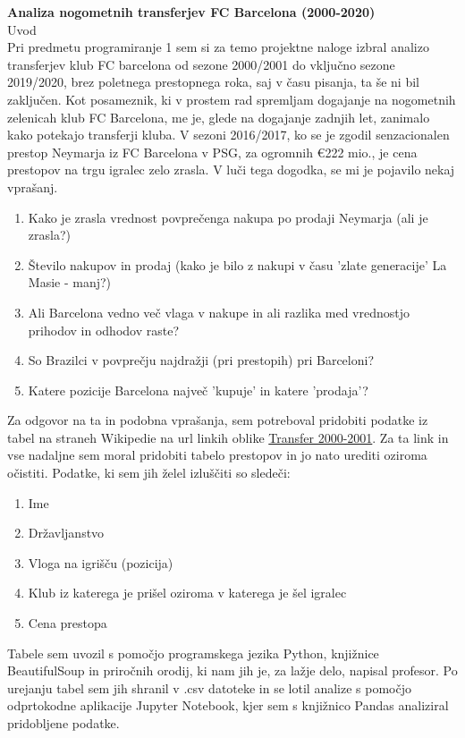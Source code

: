 \documentclass[a4paper, 12pt]{article}
\begin{document}
\thispagestyle{empty}
\begin{center}
{\bf Analiza nogometnih transferjev FC Barcelona (2000-2020)}\\[3mm]
{\sc Uvod} \\ \medskip
Pri predmetu programiranje 1 sem si za temo projektne naloge izbral analizo transferjev klub FC barcelona od sezone 2000/2001
do vključno sezone 2019/2020, brez poletnega prestopnega roka, saj v času pisanja, ta še ni bil zaključen.
Kot posameznik, ki v prostem rad spremljam dogajanje na nogometnih zelenicah klub FC Barcelona, me je, glede na dogajanje zadnjih let, zanimalo kako potekajo transferji kluba. 
V sezoni 2016/2017, ko se je zgodil senzacionalen prestop Neymarja iz FC Barcelona v PSG, za ogromnih \euro 222 mio., je cena prestopov na trgu igralec zelo zrasla. V luči tega dogodka, se mi je pojavilo nekaj vprašanj.\\

\begin{enumerate}
\item Kako je zrasla vrednost povprečenga nakupa po prodaji Neymarja (ali je zrasla?)
\item Število nakupov in prodaj (kako je bilo z nakupi v času 'zlate generacije' La Masie - manj?)
\item Ali Barcelona vedno več vlaga v nakupe in ali razlika med vrednostjo prihodov in odhodov raste?
\item So Brazilci v povprečju najdražji (pri prestopih) pri Barceloni?
\item Katere pozicije Barcelona največ 'kupuje' in katere 'prodaja'?
\end{enumerate}

Za odgovor na ta in podobna vprašanja, sem potreboval pridobiti podatke iz tabel na straneh Wikipedie na url linkih oblike \href{https://en.wikipedia.org/wiki/2000-01_FC_Barcelona_season#Transfers}{Transfer 2000-2001}. 
Za ta link in vse nadaljne sem moral pridobiti tabelo prestopov in jo nato urediti oziroma očistiti. Podatke, ki sem jih želel izluščiti so sledeči:
\begin{enumerate}
\item Ime
\item Državljanstvo
\item Vloga na igrišču (pozicija)
\item Klub iz katerega je prišel oziroma v katerega je šel igralec
\item Cena prestopa
\end{enumerate}

Tabele sem uvozil s pomočjo programskega jezika Python, knjižnice BeautifulSoup in priročnih orodij, ki nam jih je, za lažje delo, napisal profesor. 
Po urejanju tabel sem jih shranil v .csv datoteke in se lotil analize s pomočjo odprtokodne aplikacije Jupyter Notebook, kjer sem s knjižnico Pandas analiziral pridobljene podatke.

\end{center}
\pagebreak
\end{document}
